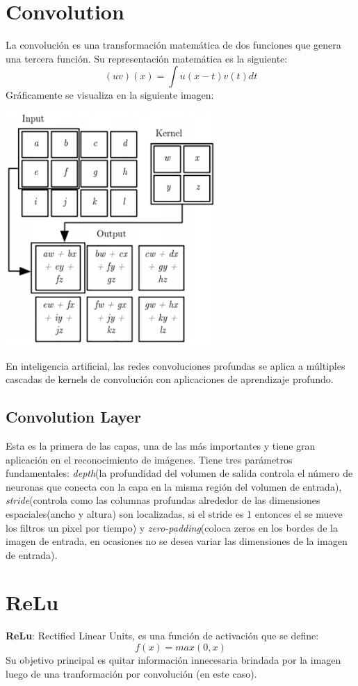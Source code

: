\documentclass{book}
\begin{document}
		\section{Convolution}
			La convoluci\'on es una transformaci\'on matem\'atica de dos funciones que genera una tercera funci\'on. Su representaci\'on matem\'atica es la siguiente:
			\begin{equation}
				(uv)(x)= \int u(x - t)v(t)dt
			\end{equation}
			Gr\'aficamente se visualiza en la siguiente imagen:
			\begin{center}
				\includegraphics[width=8cm]{15.png}
			\end{center}
			En inteligencia artificial, las redes convoluciones profundas se aplica a m\'ultiples cascadas de kernels de convoluci\'on con aplicaciones de aprendizaje profundo.
			\subsection{Convolution Layer}
				Esta es la primera de las capas, una de las m\'as importantes y tiene gran aplicaci\'on en el reconocimiento de im\'agenes. Tiene tres par\'ametros fundamentales: \textit{depth}(la profundidad del volumen de salida controla el n\'umero de neuronas que conecta con la capa en la misma regi\'on del volumen de entrada), \textit{stride}(controla como las columnas profundas alrededor de las dimensiones espaciales(ancho y altura) son localizadas, si el stride es 1 entonces el se mueve los filtros un pixel por tiempo) y \textit{zero-padding}(coloca zeros en los bordes de la imagen de entrada, en ocasiones no se desea variar las dimensiones de la imagen de entrada).
		\section{ReLu}
			\textbf{ReLu}: Rectified Linear Units, es una funci\'on de activaci\'on que se define:
			\begin{equation}
				f(x) = max(0,x)
			\end{equation}
			Su objetivo principal es quitar informaci\'on innecesaria brindada por la imagen luego de una tranformaci\'on por convoluci\'on (en este caso).
\end{document}
